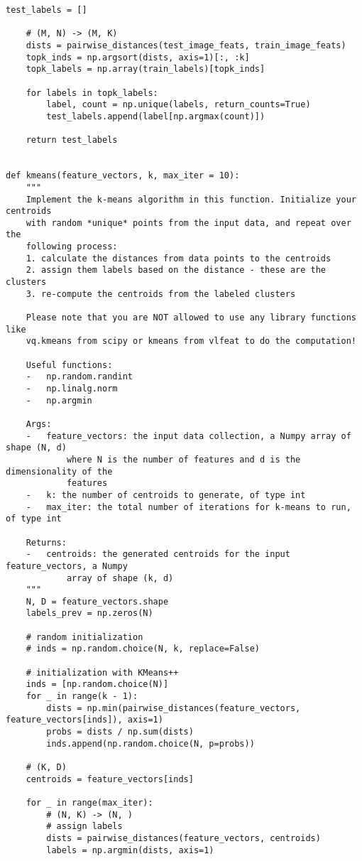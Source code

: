 \begin{lstlisting}[style=Python]
    test_labels = []
    
    # (M, N) -> (M, K)
    dists = pairwise_distances(test_image_feats, train_image_feats)
    topk_inds = np.argsort(dists, axis=1)[:, :k]
    topk_labels = np.array(train_labels)[topk_inds]

    for labels in topk_labels:
        label, count = np.unique(labels, return_counts=True)
        test_labels.append(label[np.argmax(count)])
    
    return test_labels


def kmeans(feature_vectors, k, max_iter = 10):
    """
    Implement the k-means algorithm in this function. Initialize your centroids
    with random *unique* points from the input data, and repeat over the
    following process:
    1. calculate the distances from data points to the centroids
    2. assign them labels based on the distance - these are the clusters
    3. re-compute the centroids from the labeled clusters

    Please note that you are NOT allowed to use any library functions like
    vq.kmeans from scipy or kmeans from vlfeat to do the computation!

    Useful functions:
    -   np.random.randint
    -   np.linalg.norm
    -   np.argmin

    Args:
    -   feature_vectors: the input data collection, a Numpy array of shape (N, d)
            where N is the number of features and d is the dimensionality of the
            features
    -   k: the number of centroids to generate, of type int
    -   max_iter: the total number of iterations for k-means to run, of type int

    Returns:
    -   centroids: the generated centroids for the input feature_vectors, a Numpy
            array of shape (k, d)
    """
    N, D = feature_vectors.shape
    labels_prev = np.zeros(N)
    
    # random initialization
    # inds = np.random.choice(N, k, replace=False)

    # initialization with KMeans++
    inds = [np.random.choice(N)]
    for _ in range(k - 1):
        dists = np.min(pairwise_distances(feature_vectors, feature_vectors[inds]), axis=1)
        probs = dists / np.sum(dists)
        inds.append(np.random.choice(N, p=probs))

    # (K, D)
    centroids = feature_vectors[inds]

    for _ in range(max_iter):
        # (N, K) -> (N, )
        # assign labels
        dists = pairwise_distances(feature_vectors, centroids)
        labels = np.argmin(dists, axis=1)
        

\end{lstlisting}
